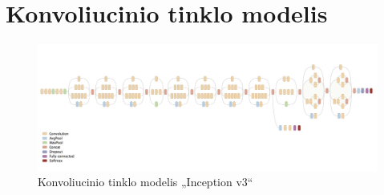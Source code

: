 \documentclass{VUMIFPSbakalaurinis}
\begin{document}
\section{Konvoliucinio tinklo modelis}
\label{appendix:inception_v3}
\begin{figure}[H]
	\centering
	\includegraphics[scale=0.2]{img/inception_v3}
	\caption{Konvoliucinio tinklo modelis „Inception v3“}
	\label{img:inception_v3}
\end{figure}

\end{document}
